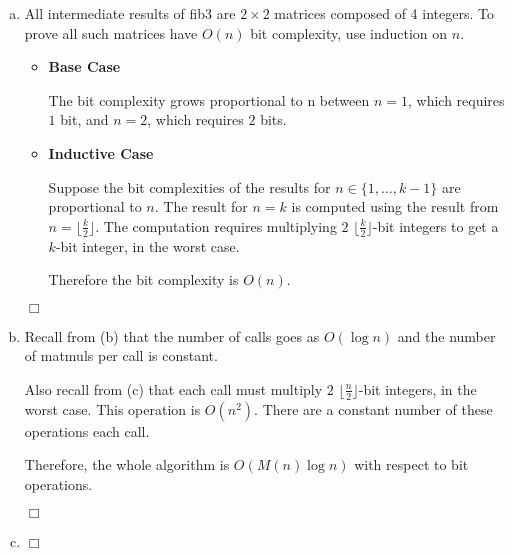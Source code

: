 \documentclass[10pt]{article}
\newenvironment{proof}{\par\noindent{\it Proof.}\hspace*{1em}}{$\Box$\bigskip}
\begin{document}
{\begin{enumerate} [(a)]
        \item {
            \begin{proof}

                All intermediate results of fib3 are $2 \times 2$ matrices composed of 4 integers. 
                To prove all such matrices have $O(n)$ bit complexity, use induction on $n$. 
                
                \begin{itemize}
                    \item {
                        \textbf{Base Case}

                        The bit complexity grows proportional to n between $n=1$, which requires $1$ bit, and $n=2$, which requires $2$ bits.
                    }
                    \item {
                        \textbf{Inductive Case}

                        Suppose the bit complexities of the results for $n \in \{1, \dots, k-1\}$ are proportional to $n$. 
                        The result for $n=k$ is computed using the result from $n = \lfloor \frac{k}{2} \rfloor$. 
                        The computation requires multiplying $2$ $\lfloor \frac{k}{2} \rfloor$-bit integers to get a $k$-bit integer, in the worst case. 

                        Therefore the bit complexity is $O(n)$. 
                    }
                \end{itemize}

            \end{proof}
        }

        \item {
            \begin{proof}

                Recall from (b) that the number of calls goes as $O(\log n)$ and the number of matmuls per call is constant. 

                Also recall from (c) that each call must multiply $2$ $\lfloor \frac{n}{2} \rfloor$-bit integers, in the worst case. 
                This operation is $O(n^2)$. There are a constant number of these operations each call. 

                Therefore, the whole algorithm is $O(M(n)\log n)$ with respect to bit operations. 

            \end{proof}
        }

        \item {
            \begin{proof}


\end{proof}}
\end{enumerate}}
\end{document}
